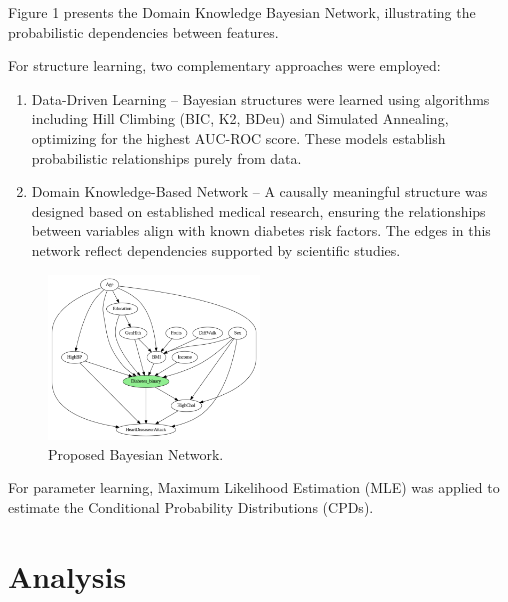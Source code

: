 \documentclass[letterpaper]{article}
\begin{document}
Figure 1 presents the Domain Knowledge Bayesian Network, illustrating the probabilistic dependencies between features.


For structure learning, two complementary approaches were employed:
\begin{enumerate}
	\item Data-Driven Learning – Bayesian structures were learned using algorithms including Hill Climbing (BIC, K2, BDeu) and Simulated Annealing, optimizing for the highest AUC-ROC score. These models establish probabilistic relationships purely from data.
	\item Domain Knowledge-Based Network – A causally meaningful structure was designed based on established medical research, ensuring the relationships between variables align with known diabetes risk factors. The edges in this network reflect dependencies supported by scientific studies.
\end{enumerate}

\begin{figure}[ht]
	\centering
	\includegraphics[width=0.5\textwidth]{images/bn-domain-knowledge.png}
	\caption{Proposed Bayesian Network.} 
	\label{fig:model}
\end{figure}

For parameter learning, Maximum Likelihood Estimation (MLE) was applied to estimate the Conditional Probability Distributions (CPDs).


\section{Analysis}
\end{document}
